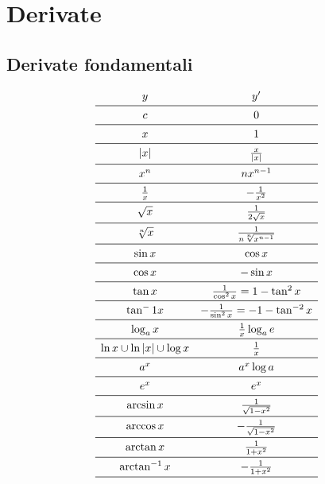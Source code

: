
\chapter{Derivate} %

\label{ch:derivate-a} %

\section{Derivate fondamentali}
\begin{equation}
\begin{array}{ c c }
y & y^\prime \\ \midrule
c & 0 \\ \midrule
x & 1 \\ \midrule
|x| & \frac{x}{|x|} \\ \midrule
x^n & nx^{n-1} \\ \midrule
\frac{1}{x} & -\frac{1}{x^2} \\ \midrule
\sqrt{x} & \frac{1}{2\sqrt{x}} \\ \midrule
\sqrt[n]{x} & \frac{1}{n\sqrt[n]{x^{n-1}}} \\ \midrule
\sin x & \cos x \\ \midrule
\cos x & -\sin x \\ \midrule
\tan x & \frac{1}{\cos^2 x} = 1-\tan^2 x \\ \midrule
\tan^-1 x & -\frac{1}{\sin^2 x}=-1-\tan^{-2}x \\ \midrule
\log_a x & \frac{1}{x}\log_a e \\ \midrule 
\ln x\cup\ln|x|\cup\log x & \frac{1}{x} \\ \midrule
a^x & a^x\log a \\ \midrule
e^x & e^x \\ \midrule
\arcsin x & \frac{1}{\sqrt{1-x^2}} \\ \midrule
\arccos x & -\frac{1}{\sqrt{1-x^2}} \\ \midrule
\arctan x & \frac{1}{1+x^2} \\ \midrule
\arctan^{-1} x & -\frac{1}{1+x^2} \\ \midrule
\end{array}
\end{equation}

